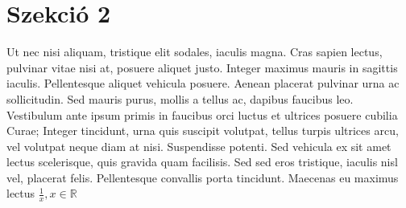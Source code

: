 \documentclass[margin=0px]{article}
\begin{document}
	\section{Szekció 2}
	
	Ut nec nisi aliquam, tristique elit sodales, iaculis magna. Cras sapien lectus, pulvinar vitae nisi at, posuere aliquet justo. Integer maximus mauris in sagittis iaculis. Pellentesque aliquet vehicula posuere. Aenean placerat pulvinar urna ac sollicitudin. Sed mauris purus, mollis a tellus ac, dapibus faucibus leo. Vestibulum ante ipsum primis in faucibus orci luctus et ultrices posuere cubilia Curae; Integer tincidunt, urna quis suscipit volutpat, tellus turpis ultrices arcu, vel volutpat neque diam at nisi. Suspendisse potenti. Sed vehicula ex sit amet lectus scelerisque, quis gravida quam facilisis. Sed sed eros tristique, iaculis nisl vel, placerat felis. Pellentesque convallis porta tincidunt. Maecenas eu maximus lectus 
	$ \frac{1}{x} , x \in  \mathbb{R} $
	
	
\end{document}
